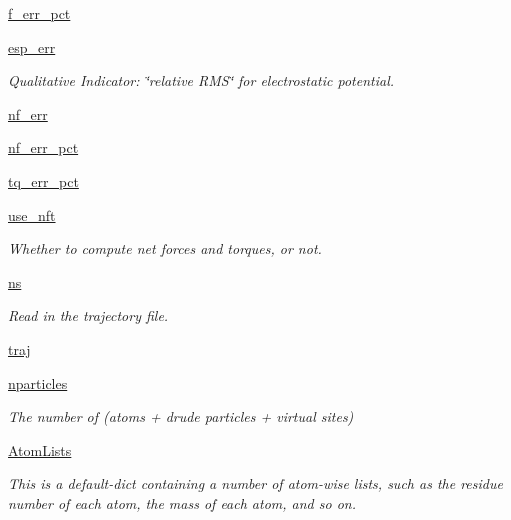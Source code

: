 \begin{DoxyCompactItemize}
\hyperlink{classforcebalance_1_1abinitio_1_1AbInitio_ab6ee932ad4689f538c746310939dd0bc}{f\-\_\-err\-\_\-pct}
\item 
\hyperlink{classforcebalance_1_1abinitio_1_1AbInitio_abdc625c3149cee375b56b4e0d73034fe}{esp\-\_\-err}
\begin{DoxyCompactList}\small\item\em Qualitative Indicator\-: \char`\"{}relative R\-M\-S\char`\"{} for electrostatic potential. \end{DoxyCompactList}\item 
\hyperlink{classforcebalance_1_1abinitio_1_1AbInitio_a89de620e9aa500481c9e1ded99e14f72}{nf\-\_\-err}
\item 
\hyperlink{classforcebalance_1_1abinitio_1_1AbInitio_a184edac2cb27a999c363595ea59d8163}{nf\-\_\-err\-\_\-pct}
\item 
\hyperlink{classforcebalance_1_1abinitio_1_1AbInitio_a184f2a783b2710f6f75842afdeccf14e}{tq\-\_\-err\-\_\-pct}
\item 
\hyperlink{classforcebalance_1_1abinitio_1_1AbInitio_afd8d179560a295ffa6c6309843c59279}{use\-\_\-nft}
\begin{DoxyCompactList}\small\item\em Whether to compute net forces and torques, or not. \end{DoxyCompactList}\item 
\hyperlink{classforcebalance_1_1abinitio_1_1AbInitio_a1e8248e2efe952362b1b21462a70b540}{ns}
\begin{DoxyCompactList}\small\item\em Read in the trajectory file. \end{DoxyCompactList}\item 
\hyperlink{classforcebalance_1_1abinitio_1_1AbInitio_a7b52d5101bfa4fde7129c84c0558ad14}{traj}
\item 
\hyperlink{classforcebalance_1_1abinitio_1_1AbInitio_aef3798e4666b91ecc4c526b679eb4908}{nparticles}
\begin{DoxyCompactList}\small\item\em The number of (atoms + drude particles + virtual sites) \end{DoxyCompactList}\item 
\hyperlink{classforcebalance_1_1abinitio_1_1AbInitio_a7e62a74e820ac0c5dd67f49155b95c41}{Atom\-Lists}
\begin{DoxyCompactList}\small\item\em This is a default-\/dict containing a number of atom-\/wise lists, such as the residue number of each atom, the mass of each atom, and so on. \end{DoxyCompactList}\item 

\end{DoxyCompactItemize}
